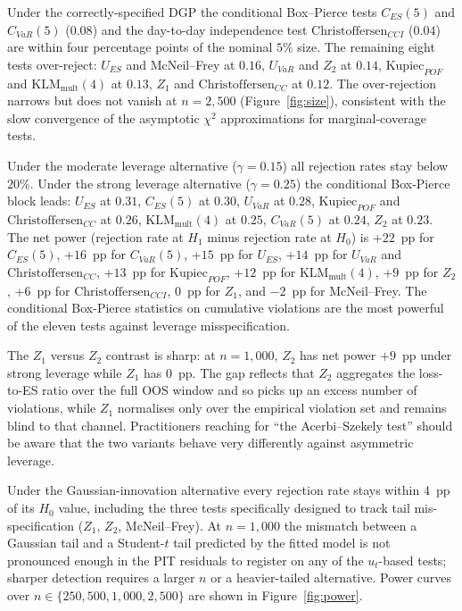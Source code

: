 \documentclass[11pt,a4paper]{article}
\theoremstyle{plain}
\begin{document}
Under the correctly-specified DGP the conditional Box--Pierce tests
$C_{ES}(5)$ and $C_{VaR}(5)$ ($0.08$) and the day-to-day independence
test $\mathrm{Christoffersen}_{CCI}$ ($0.04$) are within four
percentage points of the nominal $5\%$ size. The remaining eight
tests over-reject: $U_{ES}$ and McNeil--Frey at $0.16$, $U_{VaR}$ and
$Z_2$ at $0.14$, $\mathrm{Kupiec}_{POF}$ and
$\mathrm{KLM}_{\text{mult}}(4)$ at $0.13$, $Z_1$ and
$\mathrm{Christoffersen}_{CC}$ at $0.12$. The over-rejection narrows
but does not vanish at $n = 2{,}500$ (Figure~\ref{fig:size}),
consistent with the slow convergence of the asymptotic $\chi^2$
approximations for marginal-coverage tests.

Under the moderate leverage alternative ($\gamma = 0.15$) all
rejection rates stay below $20\%$. Under the strong leverage
alternative ($\gamma = 0.25$) the conditional Box-Pierce block leads:
$U_{ES}$ at $0.31$, $C_{ES}(5)$ at $0.30$, $U_{VaR}$ at $0.28$,
$\mathrm{Kupiec}_{POF}$ and $\mathrm{Christoffersen}_{CC}$ at
$0.26$, $\mathrm{KLM}_{\text{mult}}(4)$ at $0.25$, $C_{VaR}(5)$ at
$0.24$, $Z_2$ at $0.23$. The net power (rejection rate at $H_1$
minus rejection rate at $H_0$) is +$22$~pp for $C_{ES}(5)$, +$16$~pp
for $C_{VaR}(5)$, +$15$~pp for $U_{ES}$, +$14$~pp for $U_{VaR}$ and
$\mathrm{Christoffersen}_{CC}$, +$13$~pp for $\mathrm{Kupiec}_{POF}$,
+$12$~pp for $\mathrm{KLM}_{\text{mult}}(4)$, +$9$~pp for $Z_2$,
+$6$~pp for $\mathrm{Christoffersen}_{CCI}$, $0$~pp for $Z_1$, and
$-2$~pp for McNeil--Frey. The conditional Box-Pierce statistics on
cumulative violations are the most powerful of the eleven tests
against leverage misspecification.

The $Z_1$ versus $Z_2$ contrast is sharp: at $n = 1{,}000$, $Z_2$ has
net power $+9$~pp under strong leverage while $Z_1$ has $0$~pp. The
gap reflects that $Z_2$ aggregates the loss-to-ES ratio over the full
OOS window and so picks up an excess number of violations, while
$Z_1$ normalises only over the empirical violation set and remains
blind to that channel. Practitioners reaching for ``the
Acerbi--Szekely test'' should be aware that the two variants behave
very differently against asymmetric leverage.

Under the Gaussian-innovation alternative every rejection rate stays
within $4$~pp of its $H_0$ value, including the three tests
specifically designed to track tail mis-specification ($Z_1$, $Z_2$,
McNeil--Frey). At $n = 1{,}000$ the mismatch between a Gaussian tail
and a Student-$t$ tail predicted by the fitted model is not pronounced
enough in the PIT residuals to register on any of the $u_t$-based
tests; sharper detection requires a larger $n$ or a heavier-tailed
alternative. Power curves over $n \in \{250, 500, 1{,}000, 2{,}500\}$
are shown in Figure~\ref{fig:power}.
\end{document}
